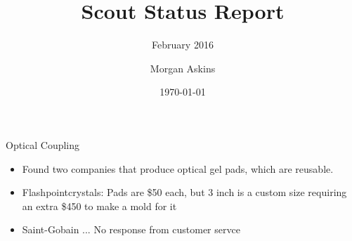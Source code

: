 \documentclass[xcolor=svgnames]{beamer}
\title{Scout Status Report}
\subtitle{February 2016}
\author{Morgan Askins}
\institute[] %
{
}
\date{\today}
\begin{document}

{
\begin{frame}[noframenumbering]
  \titlepage
\end{frame}
}




\begin{frame}{Optical Coupling}
  \begin{itemize}
    \item Found two companies that produce optical gel pads, which are reusable.
    \item Flashpointcrystals: Pads are \$50 each, but 3 inch is a custom size requiring an extra \$450 to make a mold for it
    \item Saint-Gobain ... No response from customer servce
  \end{itemize}
\end{frame}
\end{document}
